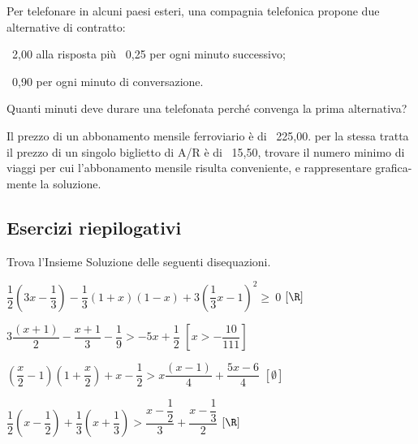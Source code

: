 \begin{htmulticols}{2}
 \begin{esercizio}[]
 \label{ese:dis_}
 Per telefonare in alcuni paesi esteri, una compagnia telefonica
propone due alternative di contratto:
\begin{enumeratea}
 \item \officialeuro\ 2,00 alla risposta più \officialeuro\ 0,25 per ogni 
minuto successivo;
\item \officialeuro\ 0,90 per ogni minuto di conversazione.
\end{enumeratea}
Quanti minuti deve durare una telefonata perché convenga la prima
alternativa?
 \end{esercizio}

\begin{esercizio}[]
 \label{ese:dis_}
 Il prezzo di un abbonamento mensile ferroviario è di \officialeuro\ 225,00.
 per la stessa tratta il prezzo di un singolo biglietto di A/R è 
di \officialeuro\ 15,50, trovare il numero minimo di viaggi per
cui l'abbonamento mensile risulta conveniente, e
rappresentare grafica-mente la soluzione.
 \end{esercizio}


\end{htmulticols}

\subsection{Esercizi riepilogativi}

\begin{esercizio}[*]
 \label{ese:21.15}
Trova l'Insieme Soluzione delle seguenti disequazioni.
 \begin{enumeratea}
\item
 \(\dfrac{1}{2}\left(3x-\dfrac{1}{3}\right)-\dfrac{1}{3}(1+x)(1-x)+
  3\left(\dfrac{1}{3}x-1\right)^{2}\ge~0\)
 \hfill \(\left[\R\right]\)
\item
 \(3\dfrac{(x+1)}{2}-\dfrac{x+1}{3}-\dfrac{1}{9}>-5x+\dfrac{1}{2}\)
 \hfill \(\left[x>-{\dfrac{10}{111}}\right]\)
\item
 \(\left(\dfrac{x}{2}-1\right)\left(1+\dfrac{x}{2}\right)+x-\dfrac{1}{2}>
  x\dfrac{(x-1)}{4}+\dfrac{5x-6}{4}\)
 \hfill \(\left[\emptyset\right]\)
\item
 \(\dfrac{1}{2}\left(x-\dfrac{1}{2}\right)+\dfrac{1}{3}\left(x+
  \dfrac{1}{3}\right)>\dfrac{x-\dfrac{1}{2}}{3}+\dfrac{x-\dfrac{1}{3}}{2}\)
 \hfill \(\left[\R\right]\)
\end{enumeratea}
\end{esercizio}

